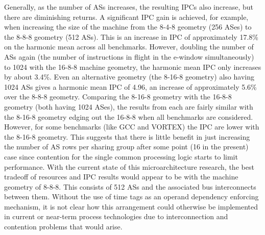 \documentclass[10pt,dvips]{article}
\begin{document}
%
Generally, as the number of ASs increases,
the resulting IPCs also increase, but there are diminishing returns.
A significant IPC gain is achieved, for example, when increasing the
size of the machine from the 8-4-8 geometry (256 ASes) to the 8-8-8 geometry
(512 ASs).  This is an increase in IPC of approximately 17.8\% on the
harmonic mean across all benchmarks.  However, doubling the number
of ASs again (the number of instructions in flight
in the e-window simultaneously) to 1024 with the 16-8-8 machine geometry,
the harmonic mean IPC only increases by about 3.4\%.  Even an
alternative geometry (the 8-16-8 geometry) also having 1024 ASs
gives a harmonic mean IPC of 4.96, an increase of approximately 5.6\%
over the 8-8-8 geometry.
Comparing the 8-16-8 geometry with the 16-8-8 geometry (both having
1024 ASes), the results from each are fairly similar with the
8-16-8 geometry edging out the 16-8-8 when all benchmarks are
considered.  However, for some benchmarks (like GCC and VORTEX)
the IPC are lower with the 8-16-8 geometry.  This suggests that
there is little benefit in just increasing the number of AS
rows per sharing group after some point (16 in the present) case
since contention for the single common processing logic starts
to limit performance.
With the current state of this microarchitecture research,
the best tradeoff of resources and IPC results would appear
to be with the machine geometry of 8-8-8.  This consists of 512
ASs and the associated bus interconnects between them. 
Without the use of time tags as an operand dependency enforcing
mechanism, it is not clear how this arrangement could otherwise be 
implemented
in current or near-term process technologies due to interconnection
and contention problems that would arise.
\end{document}
